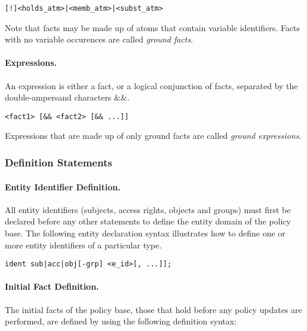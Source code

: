 \documentclass[10pt, twocolumn]{article}
\begin{document}
          \begin{verbatim}[!]<holds_atm>|<memb_atm>|<subst_atm>\end{verbatim}

          Note that facts may be made up of atoms that contain variable
          identifiers. Facts with no variable occurences are called
          {\em ground facts}.

        \paragraph{Expressions.}
          An expression is either a fact, or a logical conjunction of facts,
          separated by the double-ampersand characters $\&\&$.

          \begin{verbatim}<fact1> [&& <fact2> [&& ...]]\end{verbatim}

          Expressions that are made up of only ground facts are called
          {\em ground expressions}.

      \subsubsection{Definition Statements}

        \paragraph{Entity Identifier Definition.}

          All entity identifiers (subjects, access rights, objects and groups)
          must first be declared before any other statements to define the
          entity domain of the policy base. The following entity declaration
          syntax illustrates how to define one or more entity identifiers of a
          particular type.

          \begin{verbatim}ident sub|acc|obj[-grp] <e_id>[, ...]];\end{verbatim}

        \paragraph{Initial Fact Definition.}

          The initial facts of the policy base, those that hold before any
          policy updates are performed, are defined by using the following
          definition syntax:
\end{document}
